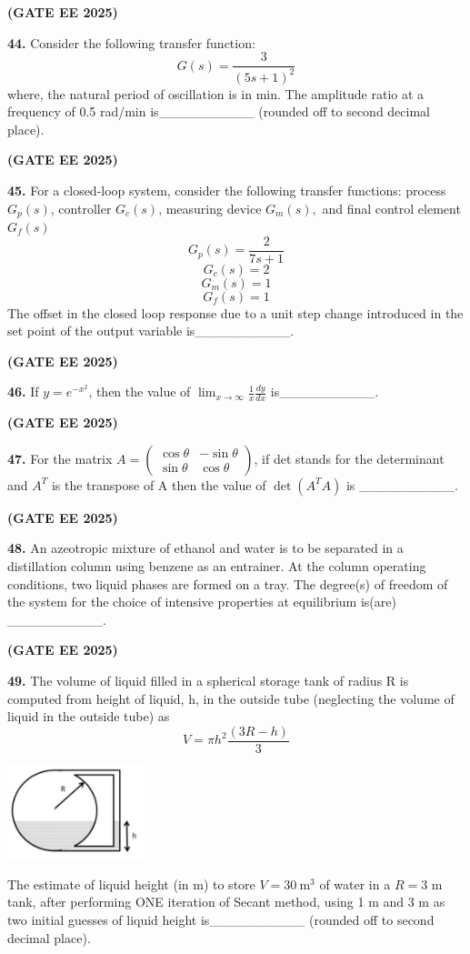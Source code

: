\documentclass[journal,12pt,onecolumn]{IEEEtran}
\newcommand{\brak}[1]{(#1)}
\begin{document}
\hfill \textbf{\brak{GATE EE 2025}}

\noindent\textbf{44.} Consider the following transfer function:
\[ G\brak{s}=\frac{3}{\brak{5s+1}^{2}} \]
where, the natural period of oscillation is in min. The amplitude ratio at a frequency of 0.5 rad/min is\_\_\_\_\_\_\_\_\_\_ \brak{rounded off to second decimal place}.

\hfill \textbf{\brak{GATE EE 2025}}

\noindent\textbf{45.} For a closed-loop system, consider the following transfer functions:
process $G_{p}\brak{s}$, controller $G_{c}\brak{s}$, measuring device $G_{m}\brak{s},$ and final control element $G_{f}\brak{s}$
\[ G_{p}\brak{s} = \frac{2}{7s+1} \]
\[ G_{c}\brak{s}=2 \]
\[ G_{m}\brak{s}=1 \]
\[ G_{f}\brak{s}=1 \]
The offset in the closed loop response due to a unit step change introduced in the set point of the output variable is\_\_\_\_\_\_\_\_\_\_.


\hfill \textbf{\brak{GATE EE 2025}}

\noindent\textbf{46.} If $y=e^{-x^{2}}$, then the value of $\lim_{x\rightarrow\infty}\frac{1}{x}\frac{dy}{dx}$ is\_\_\_\_\_\_\_\_\_\_.

\hfill \textbf{\brak{GATE EE 2025}}

\noindent\textbf{47.} For the matrix $A = \begin{pmatrix} \cos\theta & -\sin\theta \\ \sin\theta & \cos\theta \end{pmatrix}$, if det stands for the determinant and $A^{T}$ is the transpose of A then the value of $\det\brak{A^{T}A}$ is \_\_\_\_\_\_\_\_\_\_.

\hfill \textbf{\brak{GATE EE 2025}}

\noindent\textbf{48.} An azeotropic mixture of ethanol and water is to be separated in a distillation column using benzene as an entrainer. At the column operating conditions, two liquid phases are formed on a tray. The degree\brak{s} of freedom of the system for the choice of intensive properties at equilibrium is\brak{are} \_\_\_\_\_\_\_\_\_\_.


\hfill \textbf{\brak{GATE EE 2025}}

\noindent\textbf{49.} The volume of liquid filled in a spherical storage tank of radius R is computed from height of liquid, h, in the outside tube \brak{neglecting the volume of liquid in the outside tube} as
\[ V=\pi h^{2}\frac{\brak{3R-h}}{3} \]
\begin{center}
\includegraphics[width=0.3\textwidth]{figs/49.png}
\end{center}
The estimate of liquid height \brak{in m} to store $V=30~\text{m}^{3}$ of water in a $R=3$ m tank, after performing ONE iteration of Secant method, using 1 m and 3 m as two initial guesses of liquid height is\_\_\_\_\_\_\_\_\_\_ \brak{rounded off to second decimal place}.
\end{document}
